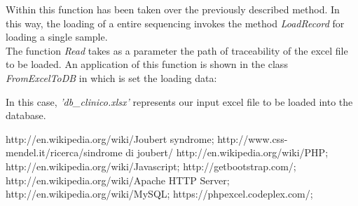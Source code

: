 \documentclass[a4paper]{report}
\begin{document}
Within this function has been taken over the previously described method. In this way, the loading of a entire sequencing  invokes the method \textit{LoadRecord} for loading a single sample.\\ 
The function \textit {Read} takes as a parameter the path of traceability of the excel file to be loaded. An application of this function is shown in the class \textit{FromExcelToDB} in which is set the loading data: 
\begin{flushleft} \small \label{scrap1}
\vspace{-1ex}
\footnotesize\addtolength{\baselineskip}{-1ex}
\end{flushleft}
In this case, \textit{'db\_clinico.xlsx'} represents our input excel file to be loaded into the database.


 
\cleardoublepage
\begin{thebibliography}{8}
 http://en.wikipedia.org/wiki/Joubert syndrome;
 http://www.css-mendel.it/ricerca/sindrome di joubert/
 http://en.wikipedia.org/wiki/PHP;
 http://en.wikipedia.org/wiki/Javascript;
 http://getbootstrap.com/;
 http://en.wikipedia.org/wiki/Apache HTTP Server;
 http://en.wikipedia.org/wiki/MySQL;
 https://phpexcel.codeplex.com/;
\end{thebibliography}
\end{document}
